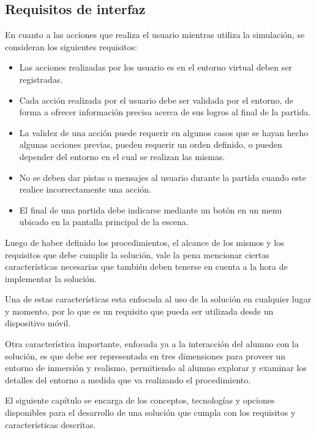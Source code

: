 \subsection{Requisitos de interfaz}

En cuanto a las acciones que realiza el usuario mientras utiliza la simulación,
se consideran los siguientes requisitos:

\begin{itemize}
\item Las acciones realizadas por los usuario es en el entorno virtual deben ser
    registradas.

\item Cada acción realizada por el usuario debe ser validada por el entorno, de
    forma a ofrecer información precisa acerca de sus logros al final de la
    partida.

\item La validez de una acción puede requerir en algunos casos que se hayan
    hecho algunas acciones previas, pueden requerir un orden definido, o pueden
    depender del entorno en el cual se realizan las mismas.

\item No se deben dar pistas o mensajes al usuario durante la partida cuando
    este realice incorrectamente una acción.

\item El final de una partida debe indicarse mediante un botón en un menu
    ubicado en la pantalla principal de la escena.

\end{itemize}

Luego de haber definido los procedimientos, el alcance de los mismos y los requisitos 
que debe cumplir la solución, vale la pena mencionar ciertas características 
necesarias que también deben tenerse en cuenta a la hora de implementar la 
solución.

Una de estas características esta enfocada al uso de la solución en cualquier 
lugar y momento, por lo que es un requisito que pueda ser utilizada desde 
un dispositivo móvil.

Otra característica importante, enfocada ya a la interacción del alumno con la 
solución, es que debe ser representada en tres dimensiones para proveer un entorno 
de inmersión y realismo, permitiendo al alumno explorar y examinar los detalles del 
entorno a medida que va realizando el procedimiento.

El siguiente capítulo se encarga de los conceptos, tecnologías y opciones 
disponibles para el desarrollo de una solución que cumpla con los requisitos y 
características descritas.

